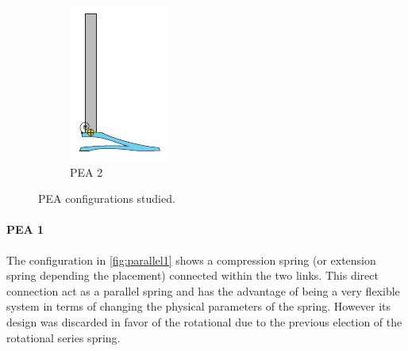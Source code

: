 \begin{figure}[ht!]
\begin{subfigure}{.19\textwidth}
    \includegraphics[width=\linewidth]{figures/illustration_parallel_rotational.pdf}
    \caption{PEA 2}
    \label{fig:parallel2}
  \end{subfigure}
  \caption{PEA configurations studied.}
  \label{fig:compliance_parallel}
\end{figure}  

\paragraph{PEA 1} %
\label{par:pea_1}
The configuration in \ref{fig:parallel1} shows a compression spring (or extension spring depending the placement) connected within the two links.
This direct connection act as a parallel spring and has the advantage of being a very flexible system in terms of changing the physical parameters of the spring. 
However its design was discarded in favor of the rotational due to the previous election of the rotational series spring.

